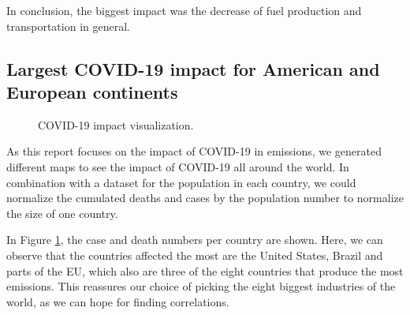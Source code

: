 In conclusion, the biggest impact was the decrease of fuel production and transportation in general.



\subsection*{Largest COVID-19 impact for American and European continents}
\begin{figure}[H]
	\centering
	\caption{COVID-19 impact visualization.}
	\label{fig:covid_cases}
\end{figure}%

As this report focuses on the impact of COVID-19 in \co emissions, we generated different maps to see the impact of COVID-19 all around the world. In combination with a dataset for the population in each country, we could normalize the cumulated deaths and cases by the population number to normalize the size of one country.

In Figure \ref{fig:covid_cases}, the case and death numbers per country are shown. Here, we can observe that the countries affected the most are the United States, Brazil and parts of the EU, which also are three of the eight countries that produce the most \co emissions. This reassures our choice of picking the eight biggest industries of the world, as we can hope for finding correlations.

